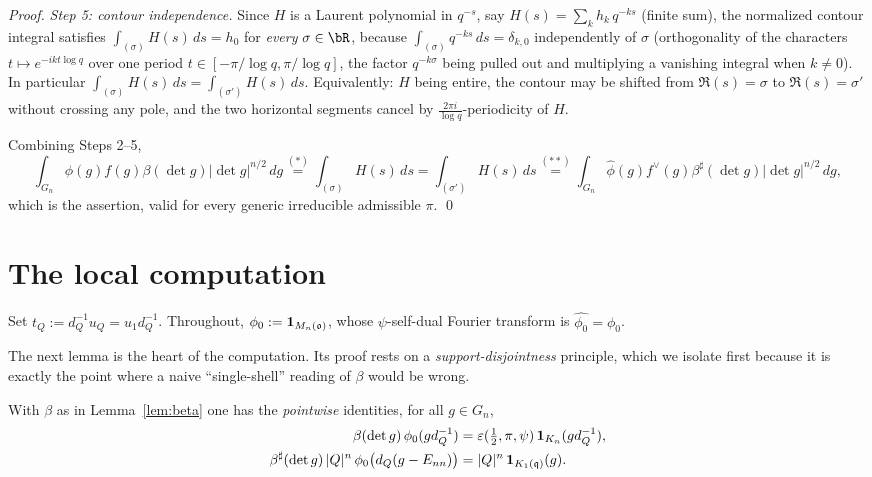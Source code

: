 \begin{proof}
\smallskip
\emph{Step 5: contour independence.} Since $H$ is a Laurent polynomial in $q^{-s}$, say
$H(s)=\sum_{k}h_k\,q^{-ks}$ (finite sum), the normalized contour integral satisfies
$\int_{(\sigma)}H(s)\,ds=h_0$ for \emph{every} $\sigma\in\bR$, because
$\int_{(\sigma)}q^{-ks}\,ds=\delta_{k,0}$ independently of $\sigma$ (orthogonality of the
characters $t\mapsto e^{-ikt\log q}$ over one period $t\in[-\pi/\log q,\pi/\log q]$, the
factor $q^{-k\sigma}$ being pulled out and multiplying a vanishing integral when $k\ne0$). In
particular $\int_{(\sigma)}H(s)\,ds=\int_{(\sigma')}H(s)\,ds$. Equivalently: $H$ being entire,
the contour may be shifted from $\Re(s)=\sigma$ to $\Re(s)=\sigma'$ without crossing any pole,
and the two horizontal segments cancel by $\frac{2\pi i}{\log q}$-periodicity of $H$.

\smallskip
Combining Steps 2--5,
\[
\int_{G_n}\phi(g)f(g)\beta(\det g)|\det g|^{n/2}\,dg
\overset{(\ast)}{=}\int_{(\sigma)}H(s)\,ds
=\int_{(\sigma')}H(s)\,ds
\overset{(\ast\ast)}{=}\int_{G_n}\widehat\phi(g)f^\vee(g)\beta^\sharp(\det g)|\det g|^{n/2}\,dg,
\]
which is the assertion, valid for every generic irreducible admissible $\pi$. \qed
\end{proof}

\section*{The local computation}

Set $t_Q:=d_Q^{-1}u_Q=u_1 d_Q^{-1}$. Throughout, $\phi_0:=\mathbf 1_{M_n(\mathfrak{o})}$,
whose $\psi$-self-dual Fourier transform is $\widehat{\phi_0}=\phi_0$.

The next lemma is the heart of the computation. Its proof rests on a
\emph{support-disjointness} principle, which we isolate first because it is exactly the
point where a naive ``single-shell'' reading of $\beta$ would be wrong.

\begin{qtwolemma}\label{lem:support}
With $\beta$ as in Lemma~\ref{lem:beta} one has the \emph{pointwise} identities, for all
$g\in G_n$,
\begin{align}
\beta(\det g)\,\phi_0(g d_Q^{-1})&=\varepsilon(\tfrac12,\pi,\psi)\,\mathbf 1_{K_n}(g d_Q^{-1}),
\label{eq:supp1}\\
\beta^\sharp(\det g)\,|Q|^{n}\,\phi_0\big(d_Q(g-E_{nn})\big)&=|Q|^{n}\,\mathbf 1_{K_1(\mathfrak{q})}(g).
\label{eq:supp2}
\end{align}
\end{qtwolemma}

